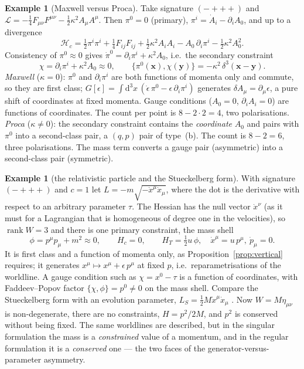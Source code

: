 \documentclass[11pt,a4paper]{article}
\theoremstyle{definition}
\newtheorem{example}[theorem]{Example}
\theoremstyle{remark}
\newcommand{\dd}{\mathrm{d}}
\newcommand{\PB}[2]{\{#1,#2\}}
\newcommand{\weq}{\approx}
\DeclareMathOperator{\rank}{rank}
\begin{document}
\begin{example}[Maxwell versus Proca]\label{ex:proca}
Take signature $(-+++)$ and $\mathcal L=-\tfrac14F_{\mu\nu}F^{\mu\nu}-\tfrac12\kappa^2A_\mu A^\mu$. Then $\pi^0=0$ (primary), $\pi^i=\dot A_i-\partial_iA_0$, and up to a divergence
\[
\mathcal H_c=\tfrac12\pi^i\pi^i+\tfrac14F_{ij}F_{ij}+\tfrac12\kappa^2A_iA_i-A_0\,\partial_i\pi^i-\tfrac12\kappa^2A_0^2 .
\]
Consistency of $\pi^0\weq0$ gives $\dot\pi^0=\partial_i\pi^i+\kappa^2A_0$, i.e.\ the secondary constraint
\[
\chi=\partial_i\pi^i+\kappa^2A_0\weq0,\qquad \PB{\pi^0(\mathbf x)}{\chi(\mathbf y)}=-\kappa^2\,\delta^3(\mathbf x-\mathbf y).
\]
\emph{Maxwell} ($\kappa=0$): $\pi^0$ and $\partial_i\pi^i$ are both functions of momenta only and commute, so they are first class; $G[\epsilon]=\int\!\dd^3x\,(\dot\epsilon\,\pi^0-\epsilon\,\partial_i\pi^i)$ generates $\delta A_\mu=\partial_\mu\epsilon$, a pure shift of coordinates at fixed momenta. Gauge conditions ($A_0=0$, $\partial_iA_i=0$) are functions of coordinates. The count per point is $8-2\cdot2=4$, two polarisations.
\emph{Proca} ($\kappa\neq0$): the secondary constraint contains the \emph{coordinate} $A_0$ and pairs with $\pi^0$ into a second-class pair, a $(q,p)$ pair of type~(b). The count is $8-2=6$, three polarisations.
The mass term converts a gauge pair (asymmetric) into a second-class pair (symmetric).
\end{example}

\begin{example}[the relativistic particle and the Stueckelberg form]\label{ex:rel}
With signature $(-+++)$ and $c=1$ let $L=-m\sqrt{-\dot x^\mu\dot x_\mu}$, where the dot is the derivative with respect to an arbitrary parameter $\tau$. The Hessian has the null vector $\dot x^\nu$ (as it must for a Lagrangian that is homogeneous of degree one in the velocities), so $\rank W=3$ and there is one primary constraint, the mass shell
\[
\phi=p^\mu p_\mu+m^2\weq0,\qquad H_c=0,\qquad H_T=\tfrac12u\,\phi,\quad \dot x^\mu=u\,p^\mu,\ \dot p_\mu=0 .
\]
It is first class and a function of momenta only, as Proposition~\ref{prop:vertical} requires; it generates $x^\mu\mapsto x^\mu+\epsilon\,p^\mu$ at fixed $p$, i.e.\ reparametrisations of the worldline. A gauge condition such as $\chi=x^0-\tau$ is a function of coordinates, with Faddeev--Popov factor $\PB\chi\phi=p^0\neq0$ on the mass shell.
Compare the Stueckelberg form with an evolution parameter, $L_S=\tfrac12M\dot x^\mu\dot x_\mu$ \cite{stueck,hp73}. Now $W=M\eta_{\mu\nu}$ is non-degenerate, there are no constraints, $H=p^2/2M$, and $p^2$ is conserved without being fixed. The same worldlines are described, but in the singular formulation the mass is a \emph{constrained} value of a momentum, and in the regular formulation it is a \emph{conserved} one --- the two faces of the generator-versus-parameter asymmetry.
\end{example}
\end{document}
